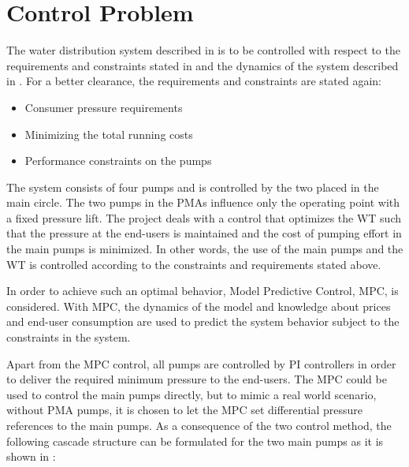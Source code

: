\section{Control Problem}
\label{control_problem}
The water distribution system described in  is to be controlled with respect to the requirements and constraints stated in  and the dynamics of the system described in . For a better clearance, the requirements and constraints are stated again: 
\begin{itemize}
	\item Consumer pressure requirements %
%
	\item Minimizing the total running costs
%
	\item Performance constraints on the pumps
\end{itemize}
The system consists of four pumps and is controlled by the two placed in the main circle. The two pumps in the PMAs influence only the operating point with a fixed pressure lift. The project deals with a control that optimizes the WT such that the pressure at the end-users is maintained and the cost of pumping effort in the main pumps is minimized. In other words, the use of the main pumps and the WT is controlled according to the constraints and requirements stated above. 

In order to achieve such an optimal behavior, Model Predictive Control, MPC, is considered. With MPC, the dynamics of the model and knowledge about prices and end-user consumption are used to predict the system behavior subject to the constraints in the system. 

Apart from the MPC control, all pumps are controlled by PI controllers in order to deliver the required minimum pressure to the end-users. The MPC could be used to control the main pumps directly, but to mimic a real world scenario, without PMA pumps, it is chosen to let the MPC set differential pressure references to the main pumps. As a consequence of the two control method, the following cascade structure can be formulated for the two main pumps as it is shown in : 

